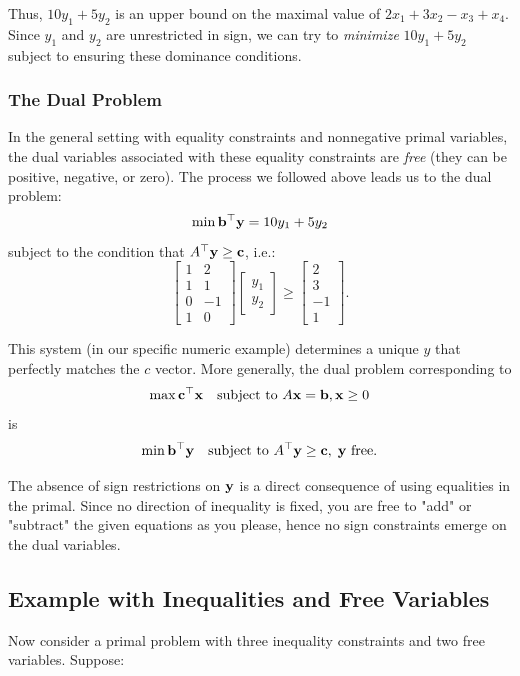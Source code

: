 Thus, $10y_1 + 5y_2$ is an upper bound on the maximal value of $2x_1 + 3x_2 - x_3 + x_4$. Since $y_1$ and $y_2$ are unrestricted in sign, we can try to \emph{minimize} $10y_1 + 5y_2$ subject to ensuring these dominance conditions.

\subsubsection*{The Dual Problem}

In the general setting with equality constraints and nonnegative primal variables, the dual variables associated with these equality constraints are \emph{free} (they can be positive, negative, or zero). The process we followed above leads us to the dual problem:
\[
\min \mathbf{b}^\top \mathbf{y} = 10y_1 + 5y_2
\]
subject to the condition that $A^\top \mathbf{y} \geq \mathbf{c}$, i.e.:
\[
\begin{bmatrix}
1 & 2 \\
1 & 1 \\
0 & -1 \\
1 & 0
\end{bmatrix}
\begin{bmatrix}y_1 \\ y_2\end{bmatrix} 
\geq
\begin{bmatrix}2 \\ 3 \\ -1 \\ 1\end{bmatrix}.
\]

This system (in our specific numeric example) determines a unique $y$ that perfectly matches the $c$ vector. More generally, the dual problem corresponding to
\[
\max \mathbf{c}^\top \mathbf{x} \quad\mbox{subject to } A \mathbf{x} = \mathbf{b}, \mathbf{x} \geq 0
\]
is
\[
\min \mathbf{b}^\top \mathbf{y} \quad \mbox{subject to } A^\top \mathbf{y} \geq \mathbf{c},\; \mathbf{y} \mbox{ free}.
\]

The absence of sign restrictions on $\mathbf{y}$ is a direct consequence of using equalities in the primal. Since no direction of inequality is fixed, you are free to "add" or "subtract" the given equations as you please, hence no sign constraints emerge on the dual variables.


\subsection*{Example with Inequalities and Free Variables}

Now consider a primal problem with three inequality constraints and two free variables. Suppose:

